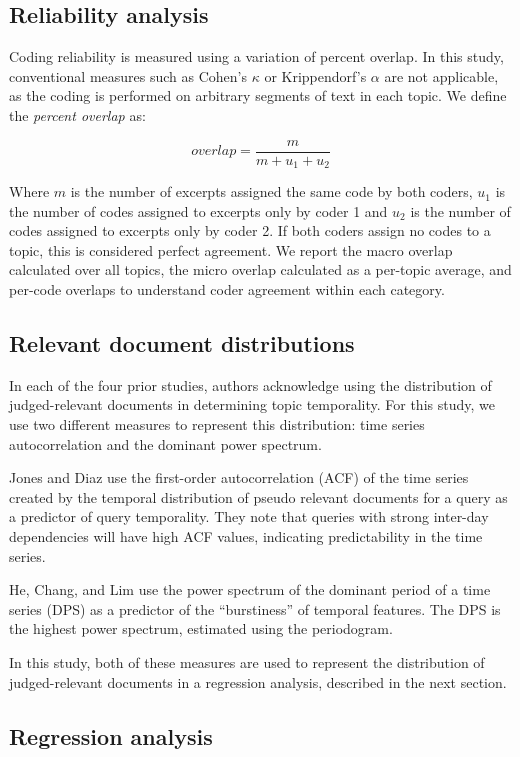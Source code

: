 \documentclass{sig-alternate}
\begin{document}
\subsection{Reliability analysis}
Coding reliability is measured using a variation of percent overlap. In this study, conventional measures such as Cohen's $\kappa$ or Krippendorf's $\alpha$ are not applicable, as the coding is performed on arbitrary segments of text in each topic. We define the \emph{percent overlap} as:

\[
overlap = \frac{m}{m + u_1 + u_2} 
\]

Where $m$ is the number of excerpts assigned the same code by both coders, $u_1$ is the number of codes assigned to excerpts only by coder 1 and $u_2$ is the number of codes assigned to excerpts only by coder 2. If both coders assign no codes to a topic, this is considered perfect agreement. We report the macro overlap calculated over all topics, the micro overlap calculated as a per-topic average, and per-code overlaps to understand coder agreement within each category.

\subsection{Relevant document distributions}

In each of the four prior studies, authors acknowledge using the distribution of judged-relevant documents in determining topic temporality. For this study, we use two different measures to represent this distribution: time series autocorrelation and the dominant power spectrum.

Jones and Diaz \cite{Jones2007} use the first-order autocorrelation (ACF) of the time series created by the temporal distribution of pseudo relevant documents for a query as a predictor of query temporality. They note that queries with strong inter-day dependencies will have high ACF values, indicating predictability in the time series.

He, Chang, and Lim \cite{He2007} use the power spectrum of the dominant period of a time series (DPS) as a predictor of the ``burstiness'' of temporal features. The DPS is the highest power spectrum, estimated using the periodogram. 

In this study, both of these measures are used to represent the distribution of judged-relevant documents in a regression analysis, described in the next section.

\subsection{Regression analysis}
\end{document}
